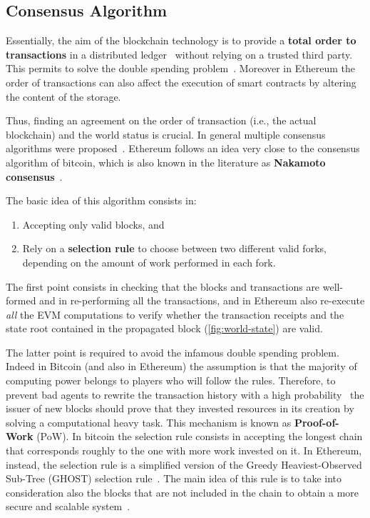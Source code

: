 \subsection{Consensus Algorithm}
\label{sec:consensus}

Essentially, the aim of the blockchain technology
is to provide a \textbf{total order to transactions} in a distributed
ledger~\cite{bib:the-quest} without relying on a trusted third party. 
This permits to solve the double spending problem~\cite{bib:bitcoin}.
Moreover in Ethereum the order of transactions can also affect the execution
of smart contracts by altering the content of the storage.

Thus, finding an agreement on the order of transaction (i.e., the actual
blockchain) and the world status is crucial.
In general multiple consensus algorithms were proposed~\cite{}. 
Ethereum
follows an idea very close to the consensus algorithm of bitcoin, which
is also known in the literature as \textbf{Nakamoto consensus}~\cite{}.

The basic idea of this algorithm consists in: 
\begin{enumerate}
\item Accepting only valid blocks, and
\item Rely on a \textbf{selection rule} to choose between two different 
valid forks, depending on the amount of work performed in each fork. 
\end{enumerate}

The first point consists in checking that the blocks and transactions are
well-formed and in re-performing all the transactions, and in Ethereum
also re-execute \emph{all} the EVM computations to verify whether the
transaction receipts and the state root contained in the propagated block 
(\autoref{fig:world-state}) are valid.

The latter point is required to avoid the infamous double spending problem.
Indeed in Bitcoin (and also in Ethereum) the assumption is that the majority
of computing power belongs to players who will follow the rules. Therefore,
to prevent bad agents to rewrite the transaction history with a high 
probability~\cite{bib:bitcoin} the issuer of
new blocks should prove that they invested resources in its creation by
solving a computational heavy task.
This mechanism is known as \textbf{Proof-of-Work} (PoW).
In bitcoin the selection rule consists in accepting the longest chain
that corresponds roughly to the one with more work invested on it.
In Ethereum, instead, the selection rule is a simplified version 
of the Greedy Heaviest-Observed Sub-Tree (GHOST) selection
rule~\cite{wood2018ethereum}.
The main idea of this rule is to take into consideration also the
blocks that are not included in the chain to obtain a more secure and
scalable system~\cite{bib:ghost}.




